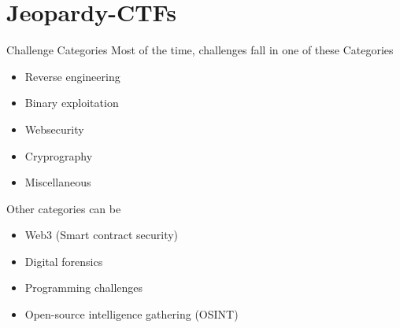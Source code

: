 \documentclass[12pt]{beamer}
\begin{document}
\section{Jeopardy-CTFs}
\begin{frame}{Challenge Categories}
    Most of the time, challenges fall in one of these Categories
    \begin{itemize}
        \item Reverse engineering
        \item Binary exploitation
        \item Websecurity
        \item Cryprography
        \item Miscellaneous
    \end{itemize}

    Other categories can be
    \begin{itemize}
        \item Web3 (Smart contract security)
        \item Digital forensics 
        \item Programming challenges
        \item Open-source intelligence gathering (OSINT)
    \end{itemize}
\end{frame}
\end{document}
